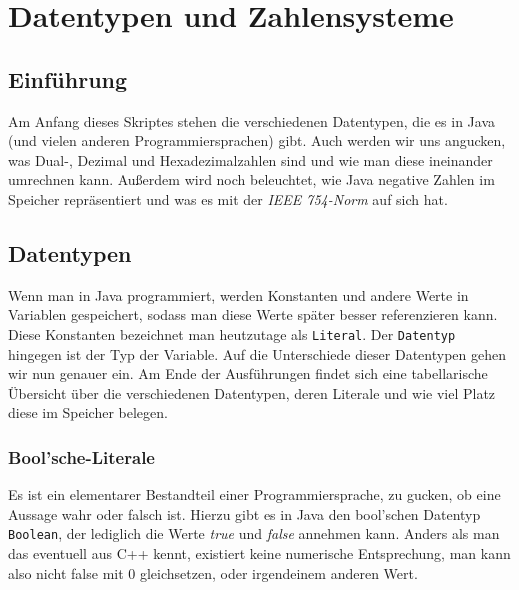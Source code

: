 
\chapter{Datentypen und Zahlensysteme}  %

\ifpdf
    \graphicspath{{Chapter1/Figs/Raster/}{Chapter1/Figs/PDF/}{Chapter1/Figs/}}
\else
    \graphicspath{{Chapter1/Figs/Vector/}{Chapter1/Figs/}}
\fi


\section{Einführung} %

Am Anfang dieses Skriptes stehen die verschiedenen Datentypen, die es in Java (und vielen anderen Programmiersprachen) gibt. Auch werden wir uns angucken, was Dual-, Dezimal und Hexadezimalzahlen sind und wie man diese ineinander umrechnen kann. Außerdem wird noch beleuchtet, wie Java negative Zahlen im Speicher repräsentiert und was es mit der \textit{IEEE 754-Norm} auf sich hat.


\section{Datentypen}


Wenn man in Java programmiert, werden Konstanten und andere Werte in Variablen gespeichert, sodass man diese Werte später besser referenzieren kann. Diese Konstanten bezeichnet man heutzutage als \texttt{Literal}. Der \texttt{Datentyp} hingegen ist der Typ der Variable. Auf die Unterschiede dieser Datentypen gehen wir nun genauer ein. Am Ende der Ausführungen findet sich eine tabellarische Übersicht über die verschiedenen Datentypen, deren Literale und wie viel Platz diese im Speicher belegen.

\subsection{Bool'sche-Literale}

Es ist ein elementarer Bestandteil einer Programmiersprache, zu gucken, ob eine Aussage wahr oder falsch ist. Hierzu gibt es in Java den bool'schen Datentyp \texttt{Boolean}, der lediglich die Werte \textit{true} und \textit{false} annehmen kann. Anders als man das eventuell aus C++ kennt, existiert keine numerische Entsprechung, man kann also nicht false mit 0 gleichsetzen, oder irgendeinem anderen Wert.

